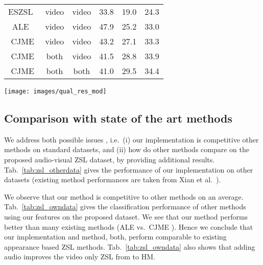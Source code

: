 \begin{table*}
\begin{minipage}[b]{.32\textwidth}
{\begin{tabular}{c|cc|ccc}
ESZSL~\cite{romera2015embarrassingly} & video & video & 33.8 & 19.0 & 24.3 \\
ALE~\cite{akata2016label} & video & video & 47.9 & 25.2 & 33.0 \\
\hline
CJME & video & video & 43.2 & 27.1 & 33.3\\
CJME & both & video & 41.5 & 28.8 & 33.9 \\
CJME & both & both & 41.0 & 29.5 & {34.4} \\
\hline
\end{tabular}
}
\caption{Comparison with existing methods on proposed dataset (projection based methods only, see sec.~\ref{sec:sota} for details)}
\label{tab:zsl_owndata}
\end{minipage}
\end{table*}

 
\begin{figure*}
\centering

\texttt{[image: images/qual\_res\_mod]}
\caption{Qualitative crossmodal retrieval results with the proposed method. Each block of two rows from top to bottom corresponds to text to audio, text to video, audio to video and video to video respectively. The small icons on the left top of each image indicates the modality considered for that specific video. Please see detailed results video in the supplementary material.}
\label{fig:qualres}
\vspace{-0.4em}
\end{figure*}
 
 \subsection{Comparison with state of the art methods}
 \label{sec:sota}
 We address both possible issues , i.e.\ (i) our implementation is competitive \wrt other methods on standard datasets, and (ii) how do other methods compare on the proposed audio-visual ZSL dataset, by providing additional results. Tab.~\ref{tab:zsl_otherdata} gives the performance of our implementation on other datasets (existing method performances are taken from Xian et al.~\cite{xian2018zero}). 
 
 We observe that our method is competitive to other methods on an average. Tab.~\ref{tab:zsl_owndata} gives the classification performance of other methods using our features on the proposed dataset. We see that our method performs better than many existing methods (\eg ALE  vs.\ CJME ). Hence we conclude that our implementation and method, both, perform comparable to existing appearance based ZSL methods. Tab.~\ref{tab:zsl_owndata} also shows that adding audio improves the video only ZSL from  to  HM. 
 
